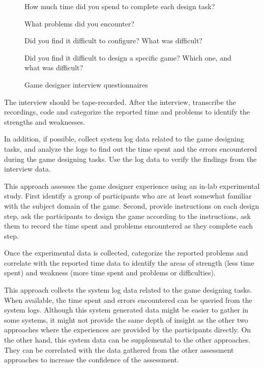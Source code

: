 \begin{figure}[ht!]
\begin{mybox}
\begin{compactenum}
\item How much time did you spend to complete each design task?
\item What problems did you encounter?
\item Did you find it difficult to configure? What was difficult?
\item Did you find it difficult to design a specific game? Which one, and what was difficult?
\end{compactenum}
\end{mybox}
\caption{Game designer interview questionnaires}
\label{fig:game-designer-interview}  
\end{figure}

The interview should be tape-recorded. After the interview, transcribe the recordings, code and categorize the reported 
time and problems to identify the strengths and weaknesses.

In addition, if possible, collect system log data related to the game designing tasks, and analyze the logs to find out the time 
spent and the errors encountered during the game designing tasks. Use the log data to verify the findings from the interview data.

\label{In-lab game design study}

This approach assesses the game designer experience using an in-lab experimental study.  First identify a group 
of participants who are at least somewhat familiar with the subject domain of the game. Second, provide instructions on 
each design step, ask the participants to design the game according to the instructions, ask them to record 
the time spent and problems encountered as they complete each step.

Once the experimental data is collected, categorize the reported problems and correlate with the reported time data 
to identify the areas of strength (less time spent) and weakness (more time spent and problems or difficulties). 

\label{Game design log data analysis}

This approach collects the system log data related to the game designing tasks. When
available, the time spent and errors encountered can be queried from the system logs. Although this
system generated data might be easier to gather in some systems, it might not provide the same
depth of insight as the other two approaches where the experiences are provided by the
participants directly. On the other hand, this system data can be supplemental to the other
approaches. They can be correlated with the data gathered from the other assessment approaches
 to increase the confidence of the assessment.

